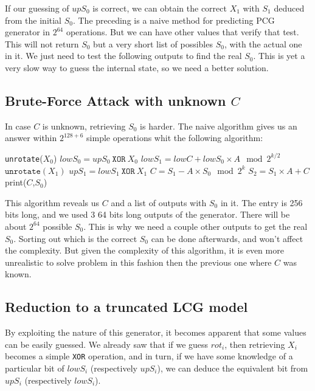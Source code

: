 \documentclass[preprint]{iacrtrans}
\begin{document}
If our guessing of $upS_0$ is correct, we can obtain the correct $X_1$ with $S_1$ deduced from the initial $S_0$. The preceding is a naive method for predicting PCG generator in $2^{64}$ operations. But we can have other values that verify that test. This will not return $S_0$ but a very short list of possibles $S_0$, with the actual one in it. We just need to test the following outputs to find the real $S_0$. This is yet a very slow way to guess the internal state, so we need a better solution.

\subsection{Brute-Force Attack with unknown $C$}

In case $C$ is unknown, retrieving $S_0$ is harder. The naive algorithm gives us an answer within $2^{128+6}$ simple operations whit the following algorithm:
\\
\begin{algorithmic}[!h]
    \STATE \texttt{unrotate}($X_0$)
    \STATE $lowS_0 = upS_0\ \mathtt{XOR}\ X_0$
    \STATE $lowS_1 = lowC + lowS_0 \times A \mod{2^{k/2}}$
        \STATE $\mathtt{unrotate}(X_1)$
        \STATE $upS_1 = lowS_1\ \mathtt{XOR}\ X_1$
        \STATE $C = S_1 - A \times S_0 \mod{2^{k}}$
        \STATE $S_2 = S_1 \times A + C$
            \STATE print($C$,$S_0$)
        \ENDIF
    \ENDFOR
\ENDFOR
\end{algorithmic}

This algorithm reveals us $C$ and a list of outputs with $S_0$ in it. The entry is 256 bits long, and we used 3 64 bits long outputs of the generator. There will be about $2^{64}$ possible $S_0$. This is why we need a couple other outputs to get the real $S_0$. Sorting out which is the correct $S_0$ can be done afterwards, and won't affect the complexity. But given the complexity of this algorithm, it is even more unrealistic to solve problem in this fashion then the previous one where $C$ was known.

\subsection{Reduction to a truncated LCG model}
By exploiting the nature of this generator, it becomes apparent that some values can be easily guessed. We already saw that if we guess $rot_i$, then retrieving $X_i$ becomes a simple \texttt{XOR} operation, and in turn, if we have some knowledge of a particular bit of $lowS_i$ (respectively $upS_i$), we can deduce the equivalent bit from $upS_i$ (respectively $lowS_i$).\\
\end{document}
